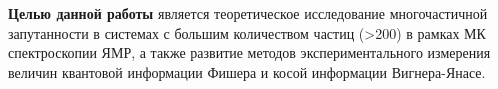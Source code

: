 \textbf{Целью данной работы} является теоретическое исследование многочастичной запутанности в системах с большим количеством частиц (>200) в рамках МК спектроскопии ЯМР,
а также развитие методов экспериментального измерения величин квантовой информации Фишера и косой информации Вигнера-Янасе.
